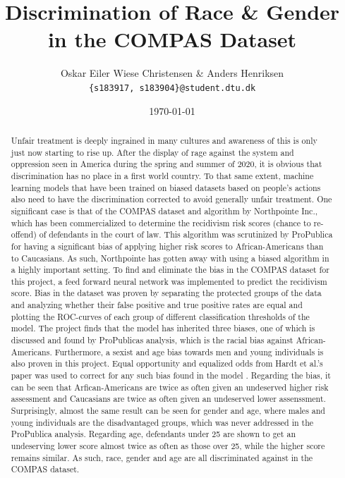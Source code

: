 \documentclass[11pt, fleqn, titlepage]{article}
\title{	Discrimination of Race \& Gender in the COMPAS Dataset}
\author{Oskar Eiler Wiese Christensen \& Anders Henriksen \\ \texttt{\{s183917, s183904\}@student.dtu.dk}}
\date{\today}
\begin{document}
	
	\maketitle
	\begin{abstract}
	\small
	\noindent
	Unfair treatment is deeply ingrained in many cultures and awareness of this is only just now starting to rise up. After the display of rage against the system and oppression seen in America during the spring and summer of 2020, it is obvious that discrimination has no place in a first world country. To that same extent, machine learning models that have been trained on biased datasets based on people's actions also need to have the discrimination corrected to avoid generally unfair treatment. One significant case is that of the COMPAS dataset and algorithm by Northpointe Inc., which has been commercialized to determine the recidivism risk scores (chance to re-offend) of defendants in the court of law. This algorithm was scrutinized by ProPublica for having a significant bias of applying higher risk scores to African-Americans than to Caucasians. As such, Northpointe has gotten away with using a biased algorithm in a highly important setting. To find and eliminate the bias in the COMPAS dataset for this project, a feed forward neural network was implemented to predict the recidivism score. Bias in the dataset was proven by separating the protected groups of the data and analyzing whether their false positive and true positive rates are equal and plotting the ROC-curves of each group of different classification thresholds of the model. The project finds that the model has inherited three biases, one of which is discussed and found by ProPublicas analysis, which is the racial bias against African-Americans. Furthermore, a sexist and age bias towards men and young individuals is also proven in this project. Equal opportunity and equalized odds from Hardt et al.'s paper was used to correct for any such bias found in the model \cite{equal_of_oppor}. Regarding the bias, it can be seen that Arfican-Americans are twice as often given an undeserved higher risk assessment and Caucasians are twice as often given an undeserved lower assenssment. Surprisingly, almost the same result can be seen for gender and age, where males and young individuals are the disadvantaged groups, which was never addressed in the ProPublica analysis. Regarding age, defendants under 25 are shown to get an undeserving lower score almost twice as often as those over 25, while the higher score remains similar. As such, race, gender and age are all discriminated against in the COMPAS dataset. 

\end{abstract}
\end{document}
